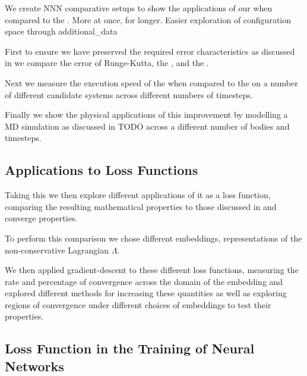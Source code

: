 \documentclass[10pt]{iopart}
\begin{document}
We create NNN comparative setups to show the applications of our \updimpl{} when compared to the \orgimpl{}. More at once, for longer. Easier exploration of configuration space through additional\_data

First to ensure we have preserved the required error characteristics as discussed in  we compare the error of Runge-Kutta, the \orgimpl{}, and the \updimpl{}.

Next we measure the execution speed of the \updimpl{} when compared to the \orgimpl{} on a number of different candidate systems across different numbers of timesteps.

Finally we show the physical applications of this improvement by modelling a MD simulation as discussed in TODO across a different number of bodies and timesteps.


\subsection{Applications to Loss Functions}

Taking this \updimpl{} we then explore different applications of it as a loss function, comparing the resulting mathematical properties to those discussed in  and converge properties.

To perform this comparison we chose different embeddings, representations of the non-conservative Lagrangian $\Lambda$.

We then applied gradient-descent\cite{gradientDescent} to these different loss functions, measuring the rate and percentage of convergence across the domain of the embedding and explored different methods for increasing these quantities as well as exploring regions of convergence under different choices of embeddings to test their properties.




\subsection{Loss Function in the Training of Neural Networks}
\end{document}
